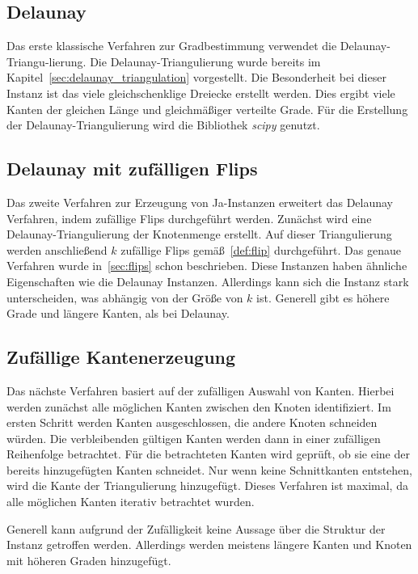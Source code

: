 \subsection{Delaunay}
Das erste klassische Verfahren zur Gradbestimmung verwendet die Delaunay-Triangu-lierung.
Die Delaunay-Triangulierung wurde bereits im Kapitel~\cref{sec:delaunay_triangulation} vorgestellt.
Die Besonderheit bei dieser Instanz ist das viele gleichschenklige Dreiecke erstellt werden.
Dies ergibt viele Kanten der gleichen Länge und gleichmäßiger verteilte Grade.
Für die Erstellung der Delaunay-Triangulierung wird die Bibliothek \emph{scipy} genutzt.



\subsection{Delaunay mit zufälligen Flips}
\label{sec:Delaunay_mit_zufällig_Flips}
Das zweite Verfahren zur Erzeugung von Ja-Instanzen erweitert das Delaunay Verfahren, indem zufällige Flips durchgeführt werden. 
Zunächst wird eine Delaunay-Triangulierung der Knotenmenge erstellt.
Auf dieser Triangulierung werden anschließend \(k\) zufällige Flips gemäß~\cref{def:flip} durchgeführt.
Das genaue Verfahren wurde in~\cref{sec:flips} schon beschrieben.
Diese Instanzen haben ähnliche Eigenschaften wie die Delaunay Instanzen.
Allerdings kann sich die Instanz stark unterscheiden, was abhängig von der Größe von \(k\) ist.
Generell gibt es höhere Grade und längere Kanten, als bei Delaunay.


\subsection{Zufällige Kantenerzeugung}
Das nächste Verfahren basiert auf der zufälligen Auswahl von Kanten.
Hierbei werden zunächst alle möglichen Kanten zwischen den Knoten identifiziert.
Im ersten Schritt werden Kanten ausgeschlossen, die andere Knoten schneiden würden.
Die verbleibenden gültigen Kanten werden dann in einer zufälligen Reihenfolge betrachtet.
Für die betrachteten Kanten wird geprüft, ob sie eine der bereits hinzugefügten Kanten schneidet.
Nur wenn keine Schnittkanten entstehen, wird die Kante der Triangulierung hinzugefügt.
Dieses Verfahren ist maximal, da alle möglichen Kanten iterativ betrachtet wurden.

Generell kann aufgrund der Zufälligkeit keine Aussage über die Struktur der Instanz getroffen werden.
Allerdings werden meistens längere Kanten und Knoten mit höheren Graden hinzugefügt.



